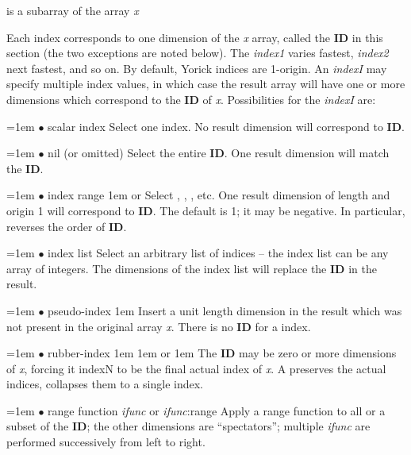 
       {is a subarray of the array {\it x}}

Each index corresponds to one dimension of the {\it x} array, called
the {\bf ID} in this section (the two exceptions are noted below).
The {\it index1\/} varies fastest, {\it index2\/} next fastest, and so
on.  By default, Yorick indices are 1-origin.  An {\it indexI\/} may
specify multiple index values, in which case the result array will
have one or more dimensions which correspond to the {\bf ID} of
{\it x}.  Possibilities for the {\it indexI} are:

\hangindent=1em
$\bullet$ scalar index \hfil\break
Select one index.  No result dimension will correspond to {\bf ID}.

\hangindent=1em
$\bullet$ nil (or omitted) \hfil\break
Select the entire {\bf ID}.  One result dimension will match the {\bf ID}.

\hangindent=1em
$\bullet$ index range \hglue 1em  or
 \hfil\break
Select , , , etc.  One
result dimension of length  and origin 1
will correspond to {\bf ID}.  The default  is 1; it may be
negative.  In particular,  reverses the order of {\bf ID}.

\hangindent=1em
$\bullet$ index list \hfil\break
Select an arbitrary list of indices -- the index list can be any array of
integers.  The dimensions of the index list will replace the {\bf ID} in
the result.

\hangindent=1em
$\bullet$ pseudo-index \hglue 1em \kbd{-} \hfil\break
Insert a unit length dimension in the result which was not present in the 
original array {\it x}.  There is no {\bf ID} for a \kbd{-} index.

\hangindent=1em
$\bullet$ rubber-index \hglue 1em  \hglue 1em or
                       \hglue 1em \kbd{*} \hfil\break
The {\bf ID} may be zero or more dimensions of {\it x}, forcing {it indexN\/}
to be the final actual index of {\it x}.  A  preserves the actual
indices, \kbd{*} collapses them to a single index.

\hangindent=1em
$\bullet$ range function {\it ifunc\/} or {\it ifunc\/}:range \hfil\break
Apply a range function to all or a subset of the {\bf ID}; the other
dimensions are ``spectators''; multiple {\it ifunc\/} are performed
successively from left to right.

